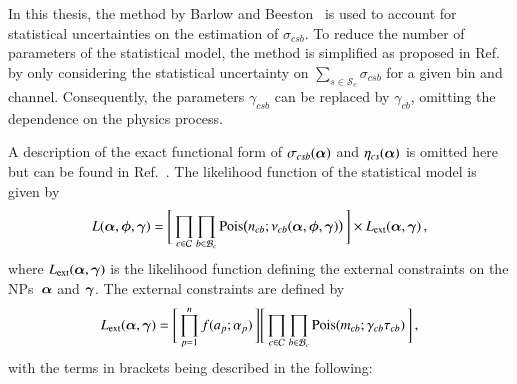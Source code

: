 \begin{itemize}
  In this thesis, the method by Barlow and Beeston~\cite{barlow1993} is used to
  account for statistical uncertainties on the estimation of $\sigma_{csb}$. To
  reduce the number of parameters of the statistical model, the method is
  simplified as proposed in Ref.~\cite{conway2011} by only considering the
  statistical uncertainty on $\sum_{s \in \mathcal{S}_{c}} \sigma_{csb}$ for a
  given bin and channel. Consequently, the parameters $\gamma_{csb}$ can be
  replaced by $\gamma_{cb}$, omitting the dependence on the physics process.

\end{itemize}
A description of the exact functional form of $\sigma_{csb}(\bm{\alpha})$ and
$\eta_{cs}(\bm{\alpha})$ is omitted here but can be found in
Ref.~\cite{cranmer2012}. The likelihood function of the statistical model is
given by
\begin{align*}
  L(\bm{\alpha}, \bm{\phi}, \bm{\gamma}) = \Biggl[\,
  \prod_{c \in \mathcal{C}}
  \prod_{b \in \mathcal{B}_{c}}
  \operatorname{Pois}\bigl( n_{cb}; \nu_{cb}(\bm{\alpha}, \bm{\phi}, \bm{\gamma}) \bigr)
  \,\Biggr]
  \times L_{\text{ext}}(\bm{\alpha}, \bm{\gamma}) \,\text{,}
\end{align*}
where $L_{\text{ext}}(\bm{\alpha}, \bm{\gamma})$ is the likelihood
function defining the external constraints on the NPs~$\bm{\alpha}$ and
$\bm{\gamma}$. The external constraints are defined by
\begin{align*}
  L_{\text{ext}}(\bm{\alpha}, \bm{\gamma}) =
  \Biggl[\, \prod_{p=1}^{n} f(a_p; \alpha_p)     \,\Biggr]
  \Biggl[\, \prod_{c \in \mathcal{C}} \prod_{b \in \mathcal{B}_{c}} \operatorname{Pois}(m_{cb}; \gamma_{cb} \tau_{cb}) \,\Biggr] \,\text{,}
\end{align*}
with the terms in brackets being described in the following:
